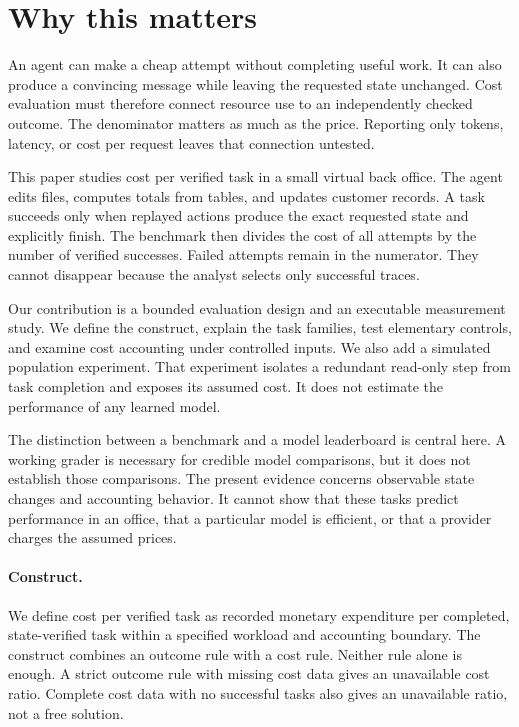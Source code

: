\documentclass{article}
\title{\PaperTitle}
\author{Pooria Arab\\Independent researcher\\ORCID: \AuthorOrcid}
\begin{document}
\maketitle
\begin{abstract}\PaperAbstract\end{abstract}
\section{Why this matters}
An agent can make a cheap attempt without completing useful work. It can also produce a convincing message while leaving the requested state unchanged. Cost evaluation must therefore connect resource use to an independently checked outcome. The denominator matters as much as the price. Reporting only tokens, latency, or cost per request leaves that connection untested.\par
This paper studies cost per verified task in a small virtual back office. The agent edits files, computes totals from tables, and updates customer records. A task succeeds only when replayed actions produce the exact requested state and explicitly finish. The benchmark then divides the cost of all attempts by the number of verified successes. Failed attempts remain in the numerator. They cannot disappear because the analyst selects only successful traces.\par
Our contribution is a bounded evaluation design and an executable measurement study. We define the construct, explain the task families, test elementary controls, and examine cost accounting under controlled inputs. We also add a simulated population experiment. That experiment isolates a redundant read-only step from task completion and exposes its assumed cost. It does not estimate the performance of any learned model.\par
The distinction between a benchmark and a model leaderboard is central here. A working grader is necessary for credible model comparisons, but it does not establish those comparisons. The present evidence concerns observable state changes and accounting behavior. It cannot show that these tasks predict performance in an office, that a particular model is efficient, or that a provider charges the assumed prices.\par
\paragraph{Construct.} We define cost per verified task as recorded monetary expenditure per completed, state-verified task within a specified workload and accounting boundary. The construct combines an outcome rule with a cost rule. Neither rule alone is enough. A strict outcome rule with missing cost data gives an unavailable cost ratio. Complete cost data with no successful tasks also gives an unavailable ratio, not a free solution.
\end{document}
